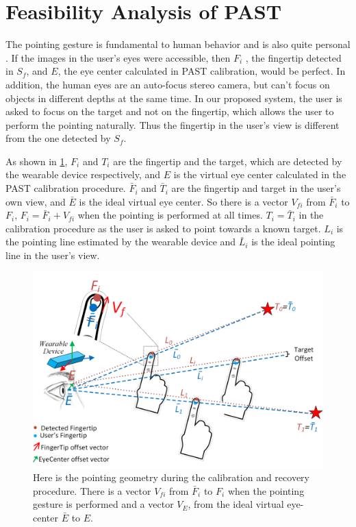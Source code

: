 \section{Feasibility Analysis of PAST} \label{sec:3-PAST:FA}
The pointing gesture is fundamental to human behavior and is also quite personal \cite{Matthews2012}. If the images in the user's eyes were accessible, then $F_i$ , the fingertip detected in $S_f$, and $E$, the eye center calculated in PAST calibration, would be perfect. In addition, the human eyes are an auto-focus stereo camera, but can't focus on objects in different depths at the same time. In our proposed system, the user is asked to focus on the target and not on the fingertip, which allows the user to perform the pointing naturally. Thus the fingertip in the user's view is different from the one detected by $S_f$. 

As shown in \figurename{ \ref{fig:3-PAST:fingertipOffset}}, $F_i$  and $T_i$  are the fingertip and the target, which are detected by the wearable device respectively, and $E$ is the virtual eye center calculated in the PAST calibration procedure. $\bar F_i$ and $\bar T_i$ are the fingertip and target in the user{\rq}s own view, and $\bar E$ is the ideal virtual eye center. So there is a vector $V_{fi}$ from $\bar F_i$ to $F_i$, $F_i = {\bar F_i} + V_{fi}$ when the pointing is performed at all times. $T_i = {\bar T_i}$ in the calibration procedure as the user is asked to point towards a known target. $L_i$ is the pointing line estimated by the wearable device and $\bar L_i$ is the ideal pointing line in the user{\rq}s view. 
\begin{figure} [htb]
	\centering
	\includegraphics[width= \linewidth]{figures/3-PAST/fingerOffset.png}
	\caption{ Here is the pointing geometry during the calibration and recovery procedure. There is a vector $V_{fi}$  from $\bar F_i$ to $F_i$ when the pointing gesture is performed and a vector $V_{E}$, from the ideal virtual eye-center ${\bar E}$ to $E$.}
	\label{fig:3-PAST:fingertipOffset}
\end{figure}
